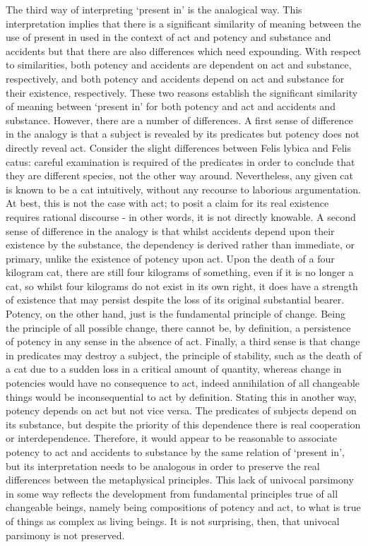 The third way of interpreting `present in' is the analogical way. This interpretation implies that there is a significant similarity of meaning between the use of present in used in the context of act and potency and substance and accidents but that there are also differences which need expounding. With respect to similarities, both potency and accidents are dependent on act and substance, respectively, and both potency and accidents depend on act and substance for their existence, respectively. These two reasons establish the significant similarity of meaning between `present in' for both potency and act and accidents and substance. However, there are a number of differences. A first sense of difference in the analogy is that a subject is revealed by its predicates but potency does not directly reveal act. Consider the slight differences between Felis lybica and Felis catus: careful examination is required of the predicates in order to conclude that they are different species, not the other way around. Nevertheless, any given cat is known to be a cat intuitively, without any recourse to laborious argumentation. At best, this is not the case with act; to posit a claim for its real existence requires rational discourse - in other words, it is not directly knowable. A second sense of difference in the analogy is that whilst accidents depend upon their existence by the substance, the dependency is derived rather than immediate, or primary, unlike the existence of potency upon act. Upon the death of a four kilogram cat, there are still four kilograms of something, even if it is no longer a cat, so whilst four kilograms do not exist in its own right, it does have a strength of existence that may persist despite the loss of its original substantial bearer. Potency, on the other hand, just is the fundamental principle of change. Being the principle of all possible change, there cannot be, by definition, a persistence of potency in any sense in the absence of act. Finally, a third sense is that change in predicates may destroy a subject, the principle of stability, such as the death of a cat due to a sudden loss in a critical amount of quantity, whereas change in potencies would have no consequence to act, indeed annihilation of all changeable things would be inconsequential to act by definition. Stating this in another way, potency depends on act but not vice versa. The predicates of subjects depend on its substance, but despite the priority of this dependence there is real cooperation or interdependence. Therefore, it would appear to be reasonable to associate potency to act and accidents to substance by the same relation of `present in', but its interpretation needs to be analogous in order to preserve the real differences between the metaphysical principles. This lack of univocal parsimony in some way reflects the development from fundamental principles true of all changeable beings, namely being compositions of potency and act, to what is true of things as complex as living beings. It is not surprising, then, that univocal parsimony is not preserved.



